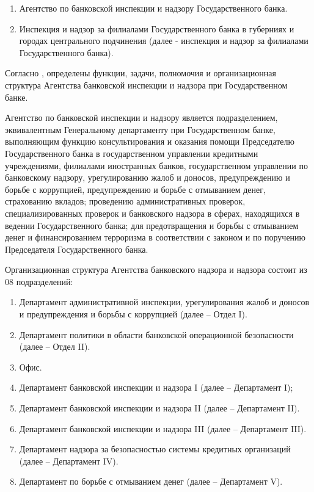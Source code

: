 \documentclass{article}
\begin{document}
\begin{enumerate}
    \item Агентство по банковской инспекции и надзору Государственного банка.
    \item Инспекция и надзор за филиалами Государственного банка в губерниях и городах центрального подчинения (далее - инспекция и надзор за филиалами Государственного банка).
\end{enumerate}

Согласно \cite{qdttg2019}, определены функции, задачи, полномочия и организационная структура Агентства банковской инспекции и надзора при Государственном банке. 

Агентство по банковской инспекции и надзору является подразделением, эквивалентным Генеральному департаменту при Государственном банке, выполняющим функцию консультирования и оказания помощи Председателю Государственного банка в государственном управлении кредитными учреждениями, филиалами иностранных банков, государственном управлении по банковскому надзору, урегулированию жалоб и доносов, предупреждению и борьбе с коррупцией, предупреждению и борьбе с отмыванием денег, страхованию вкладов; проведению административных проверок, специализированных проверок и банковского надзора в сферах, находящихся в ведении Государственного банка; для предотвращения и борьбы с отмыванием денег и финансированием терроризма в соответствии с законом и по поручению Председателя Государственного банка.

Организационная структура Агентства банковского надзора и надзора состоит из 08 подразделений:

\begin{enumerate}
    \item Департамент административной инспекции, урегулирования жалоб и доносов и предупреждения и борьбы с коррупцией (далее -- Отдел I).
    \item Департамент политики в области банковской операционной безопасности (далее -- Отдел II).
    \item Офис.
    \item Департамент банковской инспекции и надзора I (далее -- Департамент I);
    \item Департамент банковской инспекции и надзора II (далее -- Департамент II).
    \item Департамент банковской инспекции и надзора III (далее -- Департамент III).
    \item Департамент надзора за безопасностью системы кредитных организаций (далее -- Департамент IV).
    \item Департамент по борьбе с отмыванием денег (далее -- Департамент V).
\end{enumerate}
\end{document}
